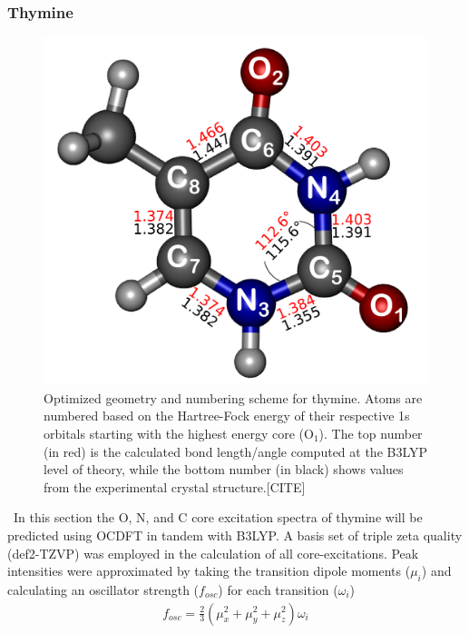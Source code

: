 \documentclass[11.5pt]{article}
\begin{document}
\subsubsection{Thymine}
  \begin{figure}[ht!]
  \includegraphics[scale=0.60]{g130.png}
  \caption{Optimized geometry and numbering scheme for thymine. Atoms are numbered based on the Hartree-Fock energy of their respective 1s orbitals starting with the highest energy core (O$_1$). The top number (in red) is the calculated bond length/angle computed at the B3LYP level of theory, while the bottom number (in black) shows values from the experimental crystal structure.[CITE]}
  \end{figure}
  \ In this section the O, N, and C core excitation spectra of thymine will be predicted using OCDFT in tandem with B3LYP.  A basis set of triple zeta quality (def2-TZVP) was employed in the calculation of all core-excitations. Peak intensities were approximated by taking the transition dipole moments ($\mu_i$) and calculating an oscillator strength ($f_{osc} $) for each transition ($\omega_{i}$)
  \begin{align}
  f_{osc} = \frac{2}{3} (\mu_x^2 + \mu_y^2 + \mu_z^2) \omega_{i}
  \end{align}
\end{document}
